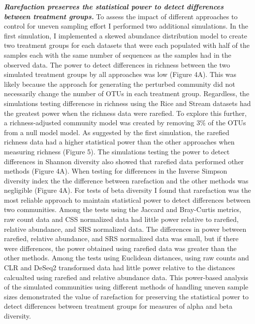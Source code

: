 \documentclass[
]{article}
\begin{document}
\textbf{\emph{Rarefaction preserves the statistical power to detect
differences between treatment groups.}} To assess the impact of
different approaches to control for uneven sampling effort I performed
two additional simulations. In the first simulation, I implemented a
skewed abundance distribution model to create two treatment groups for
each datasets that were each populated with half of the samples each
with the same number of sequences as the samples had in the observed
data. The power to detect differences in richness between the two
simulated treatment groups by all approaches was low (Figure 4A). This
was likely because the approach for generating the perturbed community
did not necessarily change the number of OTUs in each treatment group.
Regardless, the simulations testing differencse in richness using the
Rice and Stream datasets had the greatest power when the richness data
were rarefied. To explore this further, a richness-adjusted community
model was created by removing 3\% of the OTUs from a null model model.
As suggested by the first simulation, the rarefied richness data had a
higher statistical power than the other approaches when measuring
richness (Figure 5). The simulations testing the power to detect
differences in Shannon diversity also showed that rarefied data
performed other methods (Figure 4A). When testing for differences in the
Inverse Simpson diversity index the the difference between rarefaction
and the other methods was negligible (Figure 4A). For tests of beta
diversity I found that rarefaction was the most reliable approach to
maintain statistical power to detect differences between two
communities. Among the tests using the Jaccard and Bray-Curtis metrics,
raw count data and CSS normalized data had little power relative to
rarefied, relative abundance, and SRS normalized data. The differences
in power between rarefied, relative abundance, and SRS normalized data
was small, but if there were differences, the power obtained using
rarefied data was greater than the other methods. Among the tests using
Euclidean distances, using raw counts and CLR and DeSeq2 transformed
data had little power relative to the distances calcualted using
rarefied and relative abundance data. This power-based analysis of the
simulated communities using different methods of handling uneven sample
sizes demonstrated the value of rarefaction for preserving the
statistical power to detect differences between treatment groups for
measures of alpha and beta diversity.
\end{document}
